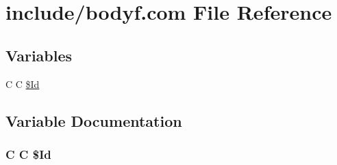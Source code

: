 \hypertarget{home_2abonfi_2_c_f_d__codes_2_eul_f_s_83_84_2include_2bodyf_8com}{\section{include/bodyf.com File Reference}
\label{home_2abonfi_2_c_f_d__codes_2_eul_f_s_83_84_2include_2bodyf_8com}
}
\subsection*{Variables}
\begin{DoxyCompactItemize}
\item 
C C \hyperlink{home_2abonfi_2_c_f_d__codes_2_eul_f_s_83_84_2include_2bodyf_8com_af40bd3a96fc1553c00422342f92046b8}{\$\-Id}
\end{DoxyCompactItemize}


\subsection{Variable Documentation}
\hypertarget{home_2abonfi_2_c_f_d__codes_2_eul_f_s_83_84_2include_2bodyf_8com_af40bd3a96fc1553c00422342f92046b8}{
\subsubsection[{\$\-Id}]{\setlength{\rightskip}{0pt plus 5cm}C C \$Id}}\label{home_2abonfi_2_c_f_d__codes_2_eul_f_s_83_84_2include_2bodyf_8com_af40bd3a96fc1553c00422342f92046b8}
